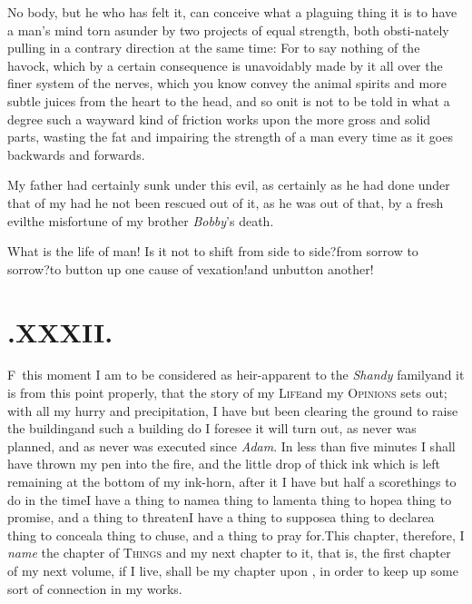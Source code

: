 \documentclass{article}
\begin{document}
No body, but he who has felt it, can conceive what a plaguing
thing it is to have a man’s mind torn asunder by two projects
of equal strength, both obsti-\break nately pulling in a contrary direction
at the same time: For to say nothing of the havock, which by a
certain consequence is unavoidably made by it all over the finer
system of the nerves, which you know convey the animal spirits and more subtle
juices from the heart to the head, and so on\tsh it is not
to be told in what a degree such a wayward kind of friction works
upon the more gross and solid parts, wasting the fat and impairing
the strength of a man every time as it goes backwards and
forwards.

My father had certainly sunk under this evil, as certainly as he
had done under that of my \tsh\break had he not been rescued out of it, as he
was out of that, by a fresh evil\tsh\break the misfortune of my
brother \textit{Bobby}’s death.

What is the life of man! Is it not to shift from side to
side?\tsk from sorrow to sorrow?\tsh to button up
one cause of vexation!\tsk and unbutton another!

\bigskip
\section{.\enspace XXXII.}

\lettrine{F}{\,} this moment I am to be\break
considered as heir-apparent to the \textit{Shandy}
family\tsh and it is from this point properly, that the
story of my \textsc{Life}\break and my \textsc{Opinions} sets
out; with all my hurry and precipitation, I have but
been clearing the ground to raise the\break
building\tsh and such a building do I\break
foresee it will turn out, as never was planned, and as never was executed since
\textit{Adam}. In less than five minutes I shall have thrown
my pen into the fire, and the little drop of thick ink which
is left remaining at the bottom of my ink-horn, after it\tsh
I have but half a score\break things to do in the time\tsh I have
a thing to name\tsh a thing to lament\tsh a thing to
hope\tsh a thing to promise, and a thing to threaten\tsk I
have a thing to suppose\tsk a thing to declare\tsh a thing
to conceal\tsh a thing to chuse, and a thing to pray
for.\tsh This chapter, therefore, I \textit{name} the chapter
of \textsc{Things}\tsh\break 
and my next chapter to it, that is, the\break
first chapter of my next volume, if I live,\break
shall be my chapter upon ,
in order to keep up some sort of connection in my works.
\end{document}
